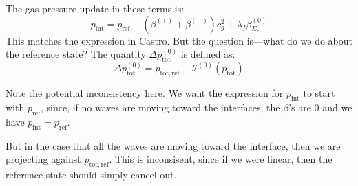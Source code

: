 \documentclass[12pt]{article}
\newcommand{\evm}{{(-)}}
\newcommand{\evz}{{(0)}}
\newcommand{\evp}{{(+)}}
\begin{document}
The gas pressure update in these terms is:
\begin{equation}
p_\mathrm{int} = p_\mathrm{ref} - (\beta^\evp + \beta^\evm) c_g^2 + \lambda_f \beta^\evz_{E_r}
\end{equation}
This matches the expression in Castro.  But the question is---what do
we do about the reference state?  The quantity $\Delta
p^\evz_\mathrm{tot}$ is defined as:
\begin{equation}
\Delta p^\evz_\mathrm{tot} = 
  p_\mathrm{tot,ref} - \mathcal{I}^\evz(p_\mathrm{tot})
\end{equation}

Note the potential inconsistency here.  We want the expression for
$p_\mathrm{int}$ to start with $p_\mathrm{ref}$, since, if no waves
are moving toward the interfaces, the $\beta$'s are $0$ and we have
$p_\mathrm{int} = p_\mathrm{ref}$.

But in the case that all the waves are moving toward the interface, then
we are projecting against $p_\mathrm{tot,ref}$.  This is inconsisent, since
if we were linear, then the reference state should simply cancel out.
\end{document}
